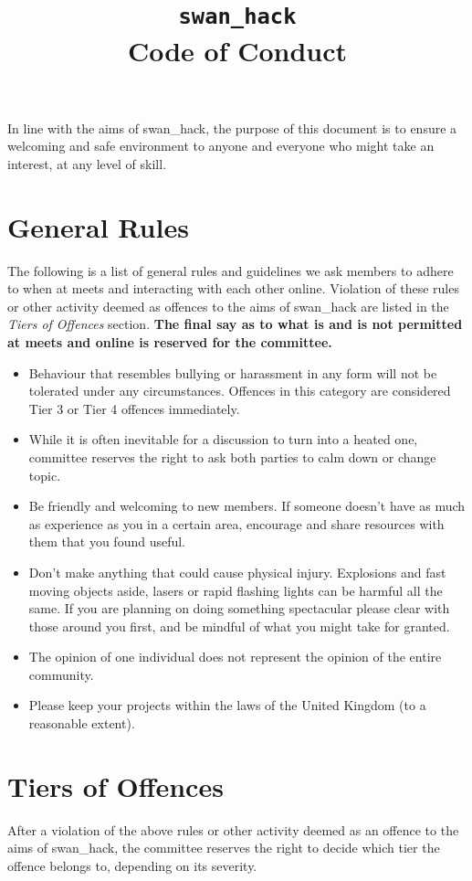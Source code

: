 \documentclass[12pt]{extarticle}
\title{\vspace{-2cm}\texttt{swan\_hack} \\ {Code of Conduct}\vspace{-1cm}}
\date{}
\begin{document}
	\maketitle
	In line with the aims of swan\_hack, the purpose of this document is to ensure a welcoming and safe environment to anyone and everyone who might take an interest, at any level of skill. 
	
	\section{General Rules}
	The following is a list of general rules and guidelines we ask members to adhere to when at meets and interacting with each other online. Violation of these rules or other activity deemed as offences to the aims of swan\_hack are listed in the \emph{Tiers of Offences} section.
    \textbf{The final say as to what is and is not permitted at meets and online is reserved for the committee.}
    
	\begin{itemize}
		\item Behaviour that resembles bullying or harassment in any form will not be tolerated under any circumstances. Offences in this category are considered Tier 3 or Tier 4 offences immediately.
		\item While it is often inevitable for a discussion to turn into a heated one, committee reserves the right to ask both parties to calm down or change topic.
		\item Be friendly and welcoming to new members. If someone doesn't have as much as experience as you in a certain area, encourage and share resources with them that you found useful.
		\item Don't make anything that could cause physical injury. Explosions and fast moving objects aside, lasers or rapid flashing lights can be harmful all the same. If you are planning on doing something spectacular please clear with those around you first, and be mindful of what you might take for granted.
		\item The opinion of one individual does not represent the opinion of the entire community.
		\item Please keep your projects within the laws of the United Kingdom (to a reasonable extent).
	\end{itemize}   
	
	\section{Tiers of Offences}
	After a violation of the above rules or other activity deemed as an offence to the aims of swan\_hack, the committee reserves the right to decide which tier the offence belongs to, depending on its severity. 
	
\end{document}
